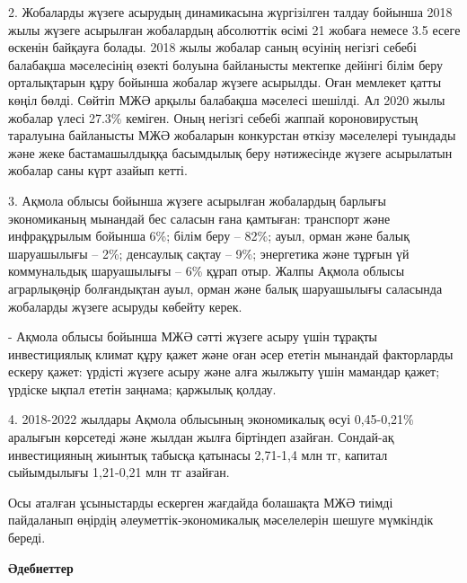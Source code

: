 \begin{multicols}{2}
2. Жобаларды жүзеге асырудың динамикасына жүргізілген талдау бойынша 2018
жылы жүзеге асырылған жобалардың абсолюттік өсімі 21 жобаға немесе 3.5
есеге өскенін байқауға болады. 2018 жылы жобалар саның өсуінің негізгі
себебі балабақша мәселесінің өзекті болуына байланысты мектепке
дейінгі білім беру орталықтарын құру бойынша жобалар жүзеге асырылды.
Оған мемлекет қатты көңіл бөлді. Сөйтіп МЖӘ арқылы балабақша мәселесі
шешілді. Ал 2020 жылы жобалар үлесі 27.3\% кеміген. Оның негізгі
себебі жаппай короновирустың таралуына байланысты МЖӘ жобаларын
конкурстан өткізу мәселелері туындады және жеке бастамашылдыққа
басымдылық беру нәтижесінде жүзеге асырылатын жобалар саны күрт азайып
кетті.

3. Ақмола облысы бойынша жүзеге асырылған жобалардың барлығы экономиканың
мынандай бес саласын ғана қамтыған: транспорт және инфрақұрылым
бойынша 6\%; білім беру -- 82\%; ауыл, орман және балық шаруашылығы --
2\%; денсаулық сақтау -- 9\%; энергетика және тұрғын үй коммунальдық
шаруашылығы -- 6\% құрап отыр. Жалпы Ақмола облысы аграрлықөңір
болғандықтан ауыл, орман және балық шаруашылығы саласында жобаларды
жүзеге асыруды көбейту керек.

- Ақмола облысы бойынша МЖӘ сәтті жүзеге асыру үшін тұрақты
инвестициялық климат құру қажет және оған әсер ететін мынандай
факторларды ескеру қажет: үрдісті жүзеге асыру және алға жылжыту үшін
мамандар қажет; үрдіске ықпал ететін заңнама; қаржылық қолдау.

4. 2018-2022 жылдары Ақмола облысының экономикалық өсуі 0,45-0,21\%
аралығын көрсетеді және жылдан жылға біртіндеп азайған. Сондай-ақ
инвестицияның жиынтық табысқа қатынасы 2,71-1,4 млн тг, капитал
сыйымдылығы 1,21-0,21 млн тг азайған.

Осы аталған ұсыныстарды ескерген жағдайда болашақта МЖӘ тиімді
пайдаланып өңірдің әлеуметтік-экономикалық мәселелерін шешуге мүмкіндік
береді.
\end{multicols}

\begin{center}
{\bfseries Әдебиеттер}
\end{center}


